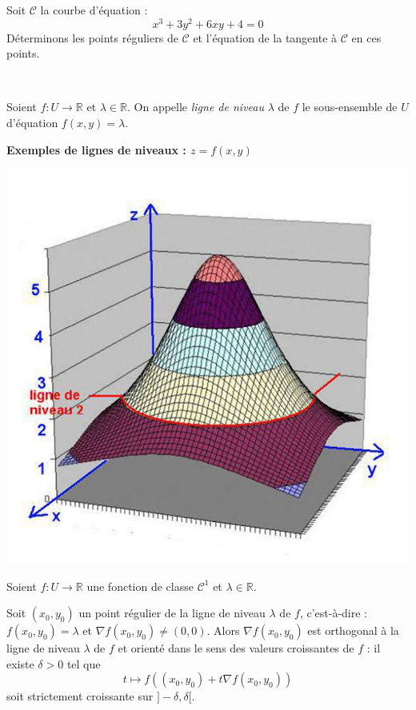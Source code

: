 \documentclass[a4paper,10pt]{report}
\begin{document}
%
%
%
%
%

\begin{ex} Soit $\mathcal{C}$ la courbe d'équation :
$$ x^3+3y^2+6xy+4=0$$
Déterminons les points réguliers de $\mathcal{C}$ et l'équation de la tangente à $\mathcal{C}$ en ces points.

\newpage

$\phantom{}$
\vspace{10cm}
\end{ex}

\begin{defin} Soient $f : U \rightarrow \mathbb{R}$ et $\lambda \in \mathbb{R}$. On appelle \textit{ligne de niveau} $\lambda$ de $f$ le sous-ensemble de $U$ d'équation $f(x,y)=\lambda$.
\end{defin}

\begin{center}
\textbf{Exemples de lignes de niveaux : $z=f(x,y)$}
\end{center}

\begin{center}
\includegraphics[scale=0.5]{niv}
\end{center}

\begin{prop} Soient $f : U \rightarrow \mathbb{R}$ une fonction de classe $\mathcal{C}^1$ et $\lambda \in \mathbb{R}$.

\noindent Soit $(x_0,y_0)$ un point régulier de la ligne de niveau $\lambda$ de $f$, c'est-à-dire : $f(x_0,y_0)=\lambda$ et $\nabla f (x_0,y_0) \neq (0,0)$. Alors $\nabla  f (x_0,y_0)$ est orthogonal  à la ligne de niveau $\lambda$ de $f$ et orienté dans le sens des valeurs croissantes de $f$ : il existe $\delta >0$ tel que 
$$ t \mapsto f((x_0,y_0) + t \nabla  f (x_0,y_0))$$
soit strictement croissante sur $]-\delta, \delta[$.
\end{prop}
\end{document}
